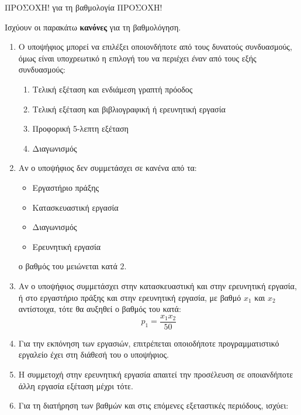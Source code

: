 \documentclass[11pt,a4paper,notitlepage,fleqn]{article}
\begin{document}
\begin{attnbox}{ΠΡΟΣΟΧΗ! για τη βαθμολογία}{}
	ΠΡΟΣΟΧΗ!
	
	Ισχύουν οι παρακάτω \textbf{κανόνες} για τη βαθμολόγηση.
\end{attnbox}

\begin{enumerate}
    \item Ο υποψήφιος μπορεί να επιλέξει οποιονδήποτε από τους δυνατούς συνδυασμούς, όμως είναι υποχρεωτικό η επιλογή του να περιέχει \textit{έναν} από τους εξής συνδυασμούς:
    \begin{enumerate}
    	\item Τελική εξέταση και ενδιάμεση γραπτή πρόοδος
    	\item Τελική εξέταση και βιβλιογραφική ή ερευνητική εργασία
    	\item Προφορική 5-λεπτη εξέταση
    	\item Διαγωνισμός
    \end{enumerate}

    \item Αν ο υποψήφιος δεν συμμετάσχει σε κανένα από τα:
    \begin{itemize}
    	\item Εργαστήριο πράξης
    	\item Κατασκευαστική εργασία
    	\item Διαγωνισμός
    	\item Ερευνητική εργασία
    \end{itemize}
    ο βαθμός του μειώνεται κατά \( 2 \).
    
    \item Αν ο υποψήφιος συμμετάσχει στην κατασκευαστική και στην ερευνητική εργασία, ή στο εργαστήριο πράξης και στην ερευνητική εργασία, με βαθμό \( x_1 \) και \( x_2 \) αντίστοιχα, τότε θα αυξηθεί ο βαθμός του κατά:
    \[
    p_1 = \frac{x_1x_2}{50}
    \]
    
    \item Για την εκπόνηση των εργασιών, επιτρέπεται οποιοδήποτε προγραμματιστικό εργαλείο έχει στη διάθεσή του ο υποψήφιος.
    
    \item Η συμμετοχή στην ερευνητική εργασία απαιτεί την προσέλευση σε οποιανδήποτε άλλη εργασία εξέταση μέχρι τότε.
    
    \item Για τη διατήρηση των βαθμών και στις επόμενες εξεταστικές περιόδους, ισχύει:
    

\end{enumerate}
\end{document}
